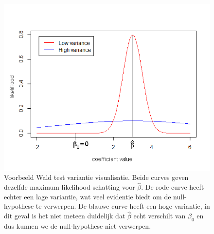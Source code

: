 \begin{abstract*}
\begin{figure}
	\centering
	\includegraphics[scale=.7]{images/wald_test}
	\caption{Voorbeeld Wald test variantie visualisatie. Beide curves geven dezelfde maximum likelihood schatting voor $\hat{\beta}$. De rode curve heeft echter een lage variantie, wat veel evidentie biedt om de null-hypothese te verwerpen. De blauwe curve heeft een hoge variantie, in dit geval is het niet meteen duidelijk dat $\hat{\beta}$ echt verschilt van $\beta_{0}$ en dus kunnen we de null-hypothese niet verwerpen.}
	\label{fig:D:evaluation-wald-test}
\end{figure}


\end{abstract*}
